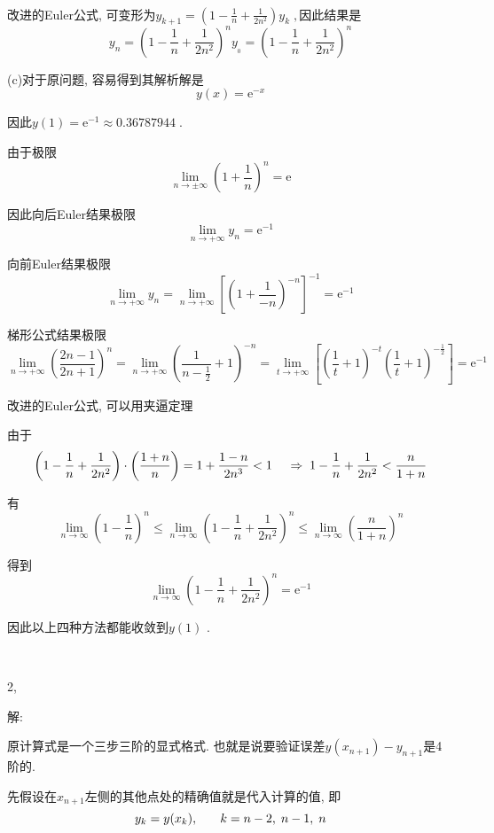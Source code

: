 \documentclass{article}
\newcommand{\mathe}{\mathrm{e}}
\newcommand{\tmtextit}[1]{\text{{\itshape{#1}}}}
\begin{document}
\

改进的Euler公式, 可变形为$y_{k + 1} = \left( 1 - \frac{1}{n} +
\frac{1}{2 n^2} \right) y_k \;,$因此结果是
\[ y_n = \left( 1 - \frac{1}{n} + \frac{1}{2 n^2} \right)^n y_{_0} = \left( 1
   - \frac{1}{n} + \frac{1}{2 n^2} \right)^n \]


(c)对于原问题, 容易得到其解析解是
\[ y (x) = \mathe^{- x} \]


因此$y (1) = \mathe^{- 1} \approx 0.36787944 \; .$

由于极限
\[ \lim_{n \rightarrow \pm \infty} \left( 1 + \frac{1}{n} \right)^n = \mathe
\]


因此向后Euler结果极限
\[ \lim_{n \rightarrow + \infty} y_n = \mathe^{- 1} \]


向前Euler结果极限
\[ \lim_{n \rightarrow + \infty} y_n = \lim_{n \rightarrow + \infty} \left[
   \left( 1 + \frac{1}{- n} \right)^{- n} \right]^{- 1} = \mathe^{- 1} \]


梯形公式结果极限
\[ \lim_{n \rightarrow + \infty} \left( \frac{2 n - 1}{2 n + 1} \right)^n =
   \lim_{n \rightarrow + \infty} \left( \frac{1}{n - \frac{1}{2}} + 1
   \right)^{- n} = \lim_{t \rightarrow + \infty} \left[ \left( \frac{1}{t} + 1
   \right)^{- t} \left( \frac{1}{t} + 1 \right)^{- \frac{1}{2}} \right] =
   \mathe^{- 1} \]


改进的Euler公式, 可以用夹逼定理

由于
\[ \left( 1 - \frac{1}{n} + \frac{1}{2 n^2} \right) \cdot \left( \frac{1 +
   n}{n} \right) = 1 + \frac{1 - n}{2 n^3} < 1 \hspace{1.2em} \Rightarrow \; 1
   - \frac{1}{n} + \frac{1}{2 n^2} < \frac{n}{1 + n} \]


有
\[ \lim_{n \rightarrow \infty} \left( 1 - \frac{1}{n} \right)^n \leqslant
   \lim_{n \rightarrow \infty} \left( 1 - \frac{1}{n} + \frac{1}{2 n^2}
   \right)^n \leqslant \lim_{n \rightarrow \infty} \left( \frac{n}{1 + n}
   \right)^n \]


得到
\[ \lim_{n \rightarrow \infty} \left( 1 - \frac{1}{n} + \frac{1}{2 n^2}
   \right)^n = \mathe^{- 1} \]


因此以上四种方法都能收敛到$y (1)$ .

\

2,

解:

原计算式是一个三步三阶的显式格式.
也就是说要验证误差$y (x_{n + 1}) - y_{n + 1}$是4阶的.

先假设在$x_{n +
1}$左侧的其他点处\tmtextit{y}的精确值就是代入计算的值, 即
\[ y_k = y (x_k), \hspace{1.8em} k = n - 2, \; n - 1, \; n \]
\end{document}
